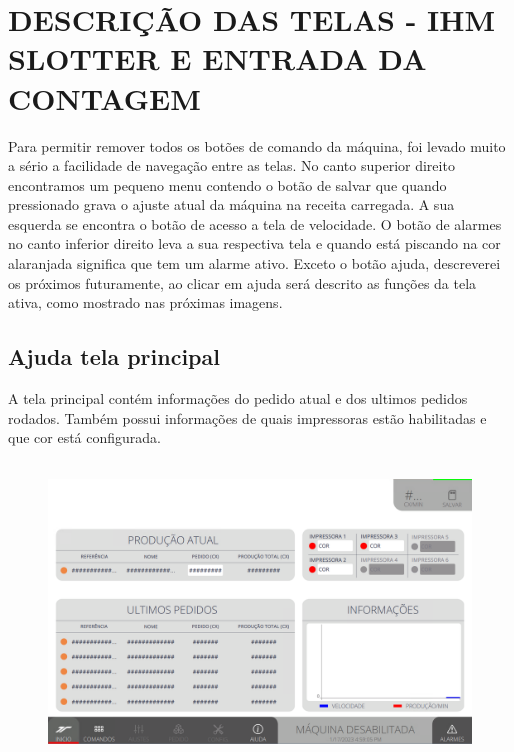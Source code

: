 \thispagestyle{fancy}

\vspace*{40 pt}

\section{\MakeUppercase{\large{Descrição das telas - IHM Slotter e Entrada da Contagem}}}

Para permitir remover todos os botões de comando da máquina, foi levado muito a sério a facilidade de navegação entre as telas.
No canto superior direito encontramos um pequeno menu contendo o botão de salvar que quando pressionado grava o ajuste atual da máquina na receita carregada. A sua esquerda se encontra o botão de acesso a tela de velocidade. O botão de alarmes no canto inferior direito leva a sua respectiva tela e quando está piscando na cor alaranjada significa que tem um alarme ativo. Exceto o botão ajuda, descreverei os próximos futuramente, ao clicar em ajuda será descrito as funções da tela ativa, como mostrado nas próximas imagens.

\subsection{Ajuda tela principal}

A tela principal contém informações do pedido atual e dos ultimos pedidos rodados. Também
possui informações de quais impressoras estão habilitadas e que cor está configurada.

\vspace*{\fill}

\begin{figure}[h]
  \centering
  \includegraphics[width=480px,height=300px]{src/imagesFlexo/01-main/e-Tela-Principal.png}
\end{figure}
\vspace*{\fill}

